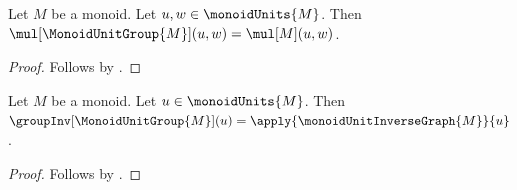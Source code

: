 \begin{proposition}\label{monoid_unit_group_mul_apply}
    Let $M$ be a monoid.
    Let $u,w\in\monoidUnits{M}$.
    Then $\mul[\MonoidUnitGroup{M}](u,w)=\mul[M](u,w)$.
\end{proposition}
\begin{proof}
    Follows by
        .
\end{proof}

\begin{proposition}\label{monoid_unit_group_inv_apply}
    Let $M$ be a monoid.
    Let $u\in\monoidUnits{M}$.
    Then $\groupInv[\MonoidUnitGroup{M}](u)=
        \apply{\monoidUnitInverseGraph{M}}{u}$.
\end{proposition}
\begin{proof}
    Follows by .
\end{proof}

